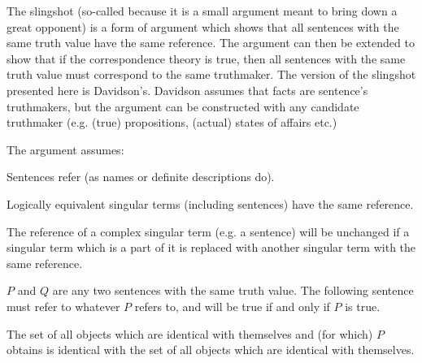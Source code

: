 The slingshot (so-called because it is a small argument meant to bring down a great opponent) is a form of argument which shows that all sentences with the same truth value have the same reference.
The argument can then be extended to show that if the correspondence theory is true, then all sentences with the same truth value must correspond to the same truthmaker.
The version of the slingshot presented here is Davidson's.
\parencite[753]{Davidson_1969}
Davidson assumes that facts are sentence's truthmakers, but the argument can be constructed with any candidate truthmaker (e.g. (true) propositions, (actual) states of affairs etc.)
\parencite[752]{Davidson_1969}

The argument assumes:

	\begin{thesis} \label{srefer}
	Sentences refer (as names or definite descriptions do).
	\end{thesis}


	\begin{thesis} \label{sameref}
	Logically equivalent singular terms (including sentences) have the same reference.
	\end{thesis}


	\begin{thesis} \label{constref}
	The reference of a complex singular term (e.g. a sentence) will be unchanged if a singular term which is a part of it is replaced with another singular term with the same reference.
	\end{thesis}

$P$ and $Q$ are any two sentences with the same truth value.
The following sentence must refer to whatever $P$ refers to, and will be true if and only if $P$ is true.

	\begin{example} \label{setP}
	The set of all objects which are identical with themselves and (for which) $P$ obtains is identical with the set of all objects which are identical with themselves.
	\end{example}

